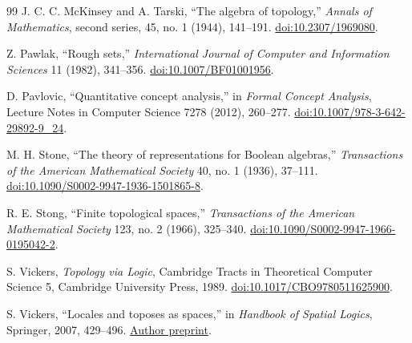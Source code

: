 \documentclass[11pt]{article}
\theoremstyle{definition}
\theoremstyle{plain}
\theoremstyle{remark}
\begin{document}
\begin{thebibliography}{99}
J. C. C. McKinsey and A. Tarski,
``The algebra of topology,''
\emph{Annals of Mathematics}, second series, 45, no. 1 (1944), 141--191.
\href{https://doi.org/10.2307/1969080}{doi:10.2307/1969080}.

Z. Pawlak,
``Rough sets,''
\emph{International Journal of Computer and Information Sciences} 11 (1982),
341--356.
\href{https://doi.org/10.1007/BF01001956}{doi:10.1007/BF01001956}.

D. Pavlovic,
``Quantitative concept analysis,'' in \emph{Formal Concept Analysis},
Lecture Notes in Computer Science 7278 (2012), 260--277.
\href{https://doi.org/10.1007/978-3-642-29892-9_24}
{doi:10.1007/978-3-642-29892-9\_24}.

M. H. Stone,
``The theory of representations for Boolean algebras,''
\emph{Transactions of the American Mathematical Society} 40, no. 1 (1936),
37--111.
\href{https://doi.org/10.1090/S0002-9947-1936-1501865-8}
{doi:10.1090/S0002-9947-1936-1501865-8}.

R. E. Stong,
``Finite topological spaces,''
\emph{Transactions of the American Mathematical Society} 123, no. 2 (1966),
325--340.
\href{https://doi.org/10.1090/S0002-9947-1966-0195042-2}
{doi:10.1090/S0002-9947-1966-0195042-2}.

S. Vickers,
\emph{Topology via Logic}, Cambridge Tracts in Theoretical Computer Science 5,
Cambridge University Press, 1989.
\href{https://doi.org/10.1017/CBO9780511625900}
{doi:10.1017/CBO9780511625900}.

S. Vickers,
``Locales and toposes as spaces,'' in \emph{Handbook of Spatial Logics},
Springer, 2007, 429--496.
\href{https://sjvickers.github.io/LocTopSpaces.pdf}
{Author preprint}.

\end{thebibliography}
\end{document}
